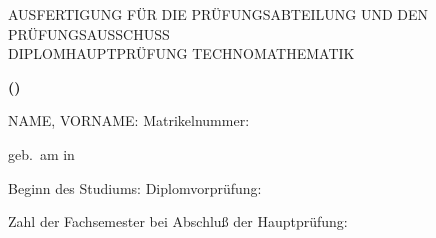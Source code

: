 \renewcommand{\baselinestretch}{1.1}

\begin{center}
{\large AUSFERTIGUNG F\"UR DIE PR\"UFUNGSABTEILUNG UND DEN PR\"UFUNGSAUSSCHUSS\\
DIPLOMHAUPTPR\"UFUNG TECHNOMATHEMATIK}

{\bf (\PRUEFUNGSORDNUNG)}
\end{center}
\vspace*{0.4cm}

NAME, VORNAME: \makebox[7.2cm]{\dotfill\qh{\tt\NAME,
 \VORNAME}\qh\dotfill}\hspace{0.25cm}
 Matrikelnummer: \hfill{\tt\MATRIKEL}

geb.~am
\makebox[5.0cm]{\dotfill\qh{\tt\GEBDAT}\qh\dotfill}\hspace{0.25cm}
 in\hspace{0.25cm}\dotfill\qh{\tt\GEBORT}\qh\dotfill

Beginn des Studiums:
\makebox[4.5cm]{\dotfill\qh{\tt\STUDBEG}\qh\dotfill}\hspace{0.25cm}
 Diplomvorpr\"ufung: \dotfill\qh{\tt\VORDIPL}\qh\dotfill

Zahl der Fachsemester bei Abschlu\ss{} der Hauptpr\"ufung:
 \makebox[6.0cm]{\dotfill\FACHSEMESTER\URLAUBSSEMESTERTEXT\dotfill}

\vspace*{0.3cm}
